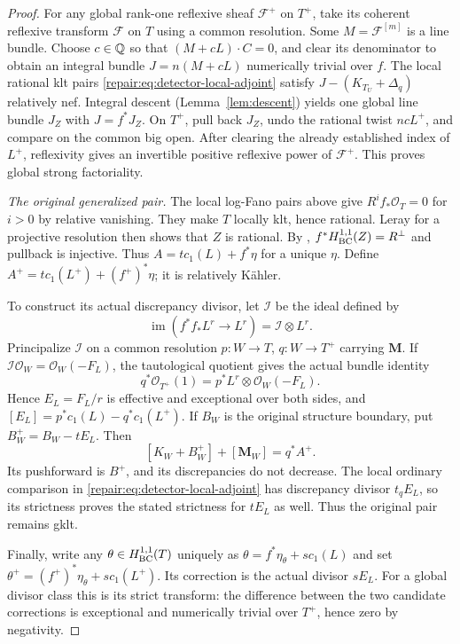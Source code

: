 \begin{proof}
For any global rank-one reflexive sheaf $\mathcal F^+$ on $T^+$,
take its coherent reflexive transform $\mathcal F$ on $T$ using a
common resolution. Some $M=\mathcal F^{[m]}$ is a line bundle.
Choose $c\in\mathbb Q$ so that $(M+cL)\cdot C=0$, and clear its denominator
to obtain an integral bundle $J=n(M+cL)$ numerically trivial over $f$.
The local rational klt pairs \eqref{repair:eq:detector-local-adjoint} satisfy
$J-(K_{T_U}+\Delta_q)$ relatively nef. Integral descent (Lemma~\ref{lem:descent}) yields
one global line bundle $J_Z$ with $J=f^*J_Z$.
On $T^+$, pull back $J_Z$, undo the rational twist $ncL^+$, and compare
on the common big open. After clearing the already established index
of $L^+$, reflexivity gives an invertible positive reflexive power of
$\mathcal F^+$. This proves global strong factoriality.

\smallskip\noindent
\emph{The original generalized pair.}
The local log-Fano pairs above give $R^if_*\mathcal O_T=0$ for $i>0$
by relative vanishing. They make $T$ locally klt, hence rational.
Leray for a projective resolution then shows that $Z$ is rational.
By \cite[Lemma~8.7]{DHP2024}, $f^*H^{1,1}_{\mathrm{BC}}(Z)=R^\perp$ and pullback is
injective. Thus $A=t c_1(L)+f^*\eta$ for a unique $\eta$.
Define $A^+=t c_1(L^+)+(f^+)^*\eta$; it is relatively K\"ahler.

To construct its actual discrepancy divisor, let $\mathcal I$ be the
ideal defined by
\[
 \operatorname{im}(f^*f_*L^r\longrightarrow L^r)
   =\mathcal I\otimes L^r.
\]
Principalize $\mathcal I$ on a common resolution $p:W\to T$,
$q:W\to T^+$ carrying $\mathbf M$. If
$\mathcal I\mathcal O_W=\mathcal O_W(-F_L)$, the tautological quotient
gives the actual bundle identity
\[
 q^*\mathcal O_{T^+}(1)=p^*L^r\otimes\mathcal O_W(-F_L).
\]
Hence $E_L=F_L/r$ is effective and exceptional over both sides, and
$[E_L]=p^*c_1(L)-q^*c_1(L^+)$. If $B_W$ is the original structure
boundary, put $B_W^+=B_W-tE_L$. Then
\[
 [K_W+B_W^+]+[\mathbf M_W]=q^*A^+.
\]
Its pushforward is $B^+$, and its discrepancies do not decrease.
The local ordinary comparison in \eqref{repair:eq:detector-local-adjoint}
has discrepancy divisor $t_qE_L$, so its strictness proves the stated
strictness for $tE_L$ as well. Thus the original pair remains gklt.

Finally, write any $\theta\in H^{1,1}_{\mathrm{BC}}(T)$ uniquely as
$\theta=f^*\eta_\theta+s c_1(L)$ and set
$\theta^+=(f^+)^*\eta_\theta+s c_1(L^+)$. Its correction is the actual
divisor $sE_L$. For a global divisor class this is its strict transform:
the difference between the two candidate corrections is exceptional
and numerically trivial over $T^+$, hence zero by negativity.
\end{proof}

